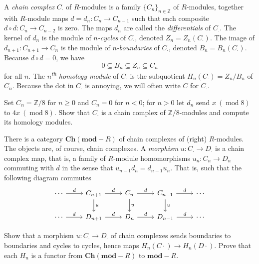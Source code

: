 \begin{definition}
  A \emph{chain complex} $C_\cdot$ of $R$-modules is a family $\{C_n\}_{n \in \mathbb{Z}}$ of $R$-modules, together with $R$-module maps $d = d_n : C_n \to C_{n - 1}$ such that each composite $d \circ d : C_n \to C_{n - 2}$ is zero. The maps $d_n$ are called the \emph{differentials} of $C_\cdot$. The kernel of $d_n$ is the module of \emph{$n$-cycles} of $C_\cdot$, denoted $Z_n = Z_n(C_\cdot)$. The image of $d_{n + 1} : C_{n + 1} \to C_n$ is the module of \emph{$n$-boundaries} of $C_\cdot$, denoted $B_n = B_n(C_\cdot)$. Because $d \circ d = 0$, we have
  \[
    0 \subseteq B_n \subseteq Z_n \subseteq C_n
  \]
  for all $n$. The \emph{$n$\textsuperscript{th} homology module} of $C_\cdot$ is the subquotient $H_n(C_\cdot) = Z_n / B_n$ of $C_n$. Because the dot in $C_\cdot$ is annoying, we will often write $C$ for $C_\cdot$.
\end{definition}

\begin{exercise}
  Set $C_n = \mathbb{Z} / 8$ for $n \geq 0$ and $C_n = 0$ for $n < 0$; for $n > 0$ let $d_n$ send $x\ (\operatorname{mod} 8)$ to $4x\ (\operatorname{mod} 8)$. Show that $C_\cdot$ is a chain complex of $\mathbb{Z} / 8$-modules and compute its homology modules.
\end{exercise}

There is a category $\mathbf{Ch}(\mathbf{mod}\!\!-\!\!R)$ of chain complexes of (right) $R$-modules. The objects are, of course, chain complexes. A \emph{morphism} $u : C_\cdot \to D_\cdot$ is a chain complex map, that is, a family of $R$-module homomorphisms $u_n : C_n \to D_n$ commuting with $d$ in the sense that $u_{n - 1} d_n = d_{n - 1} u_n$. That is, such that the following diagram commutes
\begin{equation*}
  \begin{tikzcd}
    \cdots \ar[r, "d"] & C_{n + 1} \ar[d, "u"] \ar[r, "d"] & C_n \ar[d, "u"] \ar[r, "d"] & C_{n - 1} \ar[d, "u"] \ar[r, "d"] & \cdots \\
    \cdots \ar[r, "d"] & D_{n + 1} \ar[r, "d"] & D_n \ar[r, "d"] & D_{n - 1} \ar[r, "d"] & \cdots
  \end{tikzcd}
\end{equation*}

\begin{exercise}
  Show that a morphism $u : C_\cdot \to D_\cdot$ of chain complexes sends boundaries to boundaries and cycles to cycles, hence maps $H_n(C\cdot) \to H_n(D\cdot)$. Prove that each $H_n$ is a functor from $\mathbf{Ch}(\mathbf{mod}\!\!-\!\!R)$ to $\mathbf{mod}\!\!-\!\!R$.
\end{exercise}

